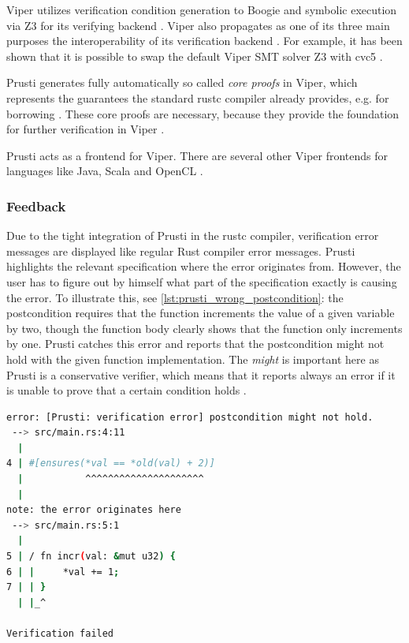 Viper utilizes verification condition generation to Boogie and symbolic execution via Z3 for its verifying backend \cite{jobstmann_viper_2016}. Viper also propagates as one of its three main purposes the interoperability of its verification backend \cite{jobstmann_viper_2016}. For example, it has been shown that it is possible to swap the default Viper SMT solver Z3 with cvc5 \cite{anthony_supporting_2022}.

Prusti generates fully automatically so called \textit{core proofs} in Viper, which represents the guarantees the standard rustc compiler already provides, e.g. for borrowing \cite{astrauskas_leveraging_2019}. These core proofs are necessary, because they provide the foundation for further verification in Viper \cite{astrauskas_leveraging_2019}.

Prusti acts as a frontend for Viper. There are several other Viper frontends for languages like Java, Scala and OpenCL \cite{jobstmann_viper_2016}.

\subsubsection{Feedback}
Due to the tight integration of Prusti in the rustc compiler, verification error messages are displayed like regular Rust compiler error messages. Prusti highlights the relevant specification where the error originates from. However, the user has to figure out by himself what part of the specification exactly is causing the error. To illustrate this, see \autoref{lst:prusti_wrong_postcondition}: the postcondition requires that the function increments the value of a given variable by two, though the function body clearly shows that the function only increments by one. Prusti catches this error and reports that the postcondition might not hold with the given function implementation. The \textit{might} is important here as Prusti is a conservative verifier, which means that it reports always an error if it is unable to prove that a certain condition holds \cite{prusti_user_guide_absence_2023}.

\begin{lstlisting}[language=bash, caption=Example output of a verification error in Prusti, label={lst:prusti_wrong_postcondition}]
error: [Prusti: verification error] postcondition might not hold.
 --> src/main.rs:4:11
  |
4 | #[ensures(*val == *old(val) + 2)]
  |           ^^^^^^^^^^^^^^^^^^^^^
  |
note: the error originates here
 --> src/main.rs:5:1
  |
5 | / fn incr(val: &mut u32) {
6 | |     *val += 1;
7 | | }
  | |_^

Verification failed
\end{lstlisting}

